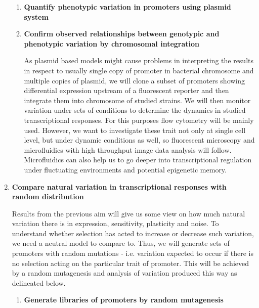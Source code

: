 \begin{enumerate}[font=\bfseries]
\begin{enumerate}[font=\bfseries]
		\item \textbf{Quantify phenotypic variation in promoters using plasmid system}
		


		\item \textbf{Confirm observed relationships between genotypic and phenotypic variation by chromosomal integration}
		
		As plasmid based models might cause problems in interpreting the results in respect to usually single copy of promoter in bacterial chromosome and multiple copies of plasmid, we will clone a subset of promoters showing differential expression upstream of a fluorescent reporter and then integrate them into chromosome of studied strains.
		We will then monitor variation under sets of conditions to determine the dynamics in studied transcriptional responses.
		For this purposes flow cytometry will be mainly used.
		However, we want to investigate these trait not only at single cell level, but under dynamic conditions as well, so fluorescent microscopy and microfluidics with high throughput image data analysis will follow.
		Microfluidics can also help us to go deeper into transcriptional regulation under fluctuating environments and potential epigenetic memory.

	\end{enumerate}
	
	\item \textbf{Compare natural variation in transcriptional responses with random distribution}
	
	Results from the previous aim will give us some view on how much natural variation there is in expression, sensitivity, plasticity and noise.
	To understand whether selection has acted to increase or decrease such variation, we need a neutral model to compare to.
	Thus, we will generate sets of promoters with random mutations - i.e. variation expected to occur if there is no selection acting on the particular trait of promoter.
	This will be achieved by a random mutagenesis and analysis of variation produced this way as delineated below.

	\begin{enumerate}[font=\bfseries]
	
		\item \textbf{Generate libraries of promoters by random mutagenesis}
		

\end{enumerate}
\end{enumerate}
